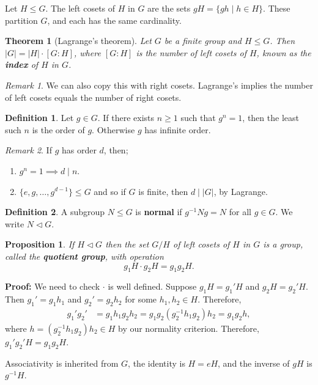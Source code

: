 \documentclass[12pt]{article}
\newtheorem{theorem}{Theorem}[section]
\newtheorem{proposition}{Proposition}[section]
\theoremstyle{definition}
\newtheorem{definition}{Definition}[section]
\theoremstyle{remark}
\newtheorem*{remark}{Remark}
\begin{document}
Let $H \leq G$. The left cosets of $H$ in $G$ are the sets $gH = \{gh \mid h \in H\}$. These partition $G$, and each has the same cardinality.

\begin{theorem}[Lagrange's theorem]
	Let $G$ be a finite group and $H \leq G$. Then $|G| = |H| \cdot [G:H]$, where $[G:H]$ is the number of left cosets of $H$, known as the \textbf{index} of $H$ in $G$.
\end{theorem}

\begin{remark}
	We can also copy this with right cosets. Lagrange's implies the number of left cosets equals the number of right cosets.
\end{remark}

\begin{definition}
	Let $g \in G$. If there exists $n \geq 1$ such that $g^{n} = 1$, then the least such $n$ is the order of $g$. Otherwise $g$ has infinite order.
\end{definition}

\begin{remark}
	If $g$ has order $d$, then;
	\begin{enumerate}[label = (\roman*)]
		\item $g^{n} = 1 \implies d \mid n$.
		\item $\{e, g, \ldots, g^{d - 1}\} \leq G$ and so if $G$ is finite, then $d \mid |G|$, by Lagrange.
	\end{enumerate}
\end{remark}
 
\begin{definition}
	A subgroup $N \leq G$ is \textbf{normal} if $g^{-1}Ng = N$ for all $g \in G$. We write $N \lhd G$.
\end{definition}

\begin{proposition}
	If $H \lhd G$ then the set $G/H$ of left cosets of $H$ in $G$ is a group, called the \textbf{quotient group}, with operation
	\[
	g_1H \cdot g_2H = g_1g_2H
	.\]
\end{proposition}

\begin{adjustbox}{minipage = \columnwidth - 25.5pt, margin=1em, frame=1pt, margin=0em}
\textbf{Proof:} We need to check $\cdot$ is well defined. Suppose $g_1H = g_1'H$ and $g_2H = g_2'H$. Then $g_1' = g_1h_1$ and $g_2' = g_2h_2$ for some $h_1, h_2 \in H$. Therefore,
\begin{align*}
	g_1'g_2' &= g_1h_1g_2h_2 = g_1g_2(g_2^{-1}h_1g_2)h_2 = g_1g_2 h,
\end{align*}
where $h = (g_2^{-1} h_1 g_2) h_2 \in H$ by our normality criterion. Therefore, $g_1'g_2'H = g_1g_2H$.

Associativity is inherited from $G$, the identity is $H = eH$, and the inverse of $gH$ is $g^{-1}H$.

\end{adjustbox}
\end{document}

